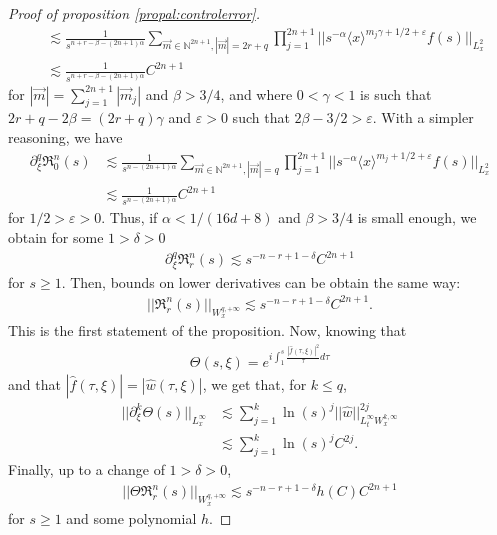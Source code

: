 \documentclass[10pt,a4paper]{amsart}
\begin{document}
\begin{proof}[Proof of proposition \ref{propal:controlerror}]
\begin{align*}
    &\lesssim \frac{1}{s^{n+r-\beta-(2n+1)\alpha}}\sum_{\overrightarrow{m}\in\mathbb{N}^{2n+1}, |\overrightarrow{m}|=2r+q}\prod^{2n+1}_{j=1}||s^{-\alpha}\langle x\rangle^{m_j\gamma+1/2+\varepsilon} f(s)||_{L^2_x} \\
    &\lesssim \frac{1}{s^{n+r-\beta-(2n+1)\alpha}}C^{2n+1}
\end{align*}
for $|\overrightarrow{m}|=\sum_{j=1}^{2n+1}|\overrightarrow{m}_j|$ and $\beta>3/4$, and where $0<\gamma<1$ is such that $2r+q-2\beta=(2r+q)\gamma$ and $\varepsilon>0$ such that $2\beta-3/2>\varepsilon$. With a simpler reasoning, we have 
\begin{align*}
    \partial^q_\xi \mathfrak{R}^n_0(s)
    &\lesssim \frac{1}{s^{n-(2n+1)\alpha}}\sum_{\overrightarrow{m}\in\mathbb{N}^{2n+1}, |\overrightarrow{m}|=q}\prod^{2n+1}_{j=1}||s^{-\alpha}\langle x\rangle^{m_j+1/2+\varepsilon} f(s)||_{L^2_x} \\
    &\lesssim \frac{1}{s^{n-(2n+1)\alpha}}C^{2n+1}
\end{align*}
for $1/2>\varepsilon>0$. Thus, if $\alpha<1/(16d+8)$ and $\beta>3/4$ is small enough, we obtain for some $1>\delta>0$
\begin{align*}
    \partial^q_\xi \mathfrak{R}^n_r(s)\lesssim s^{-n-r+1-\delta}C^{2n+1}
\end{align*}
for $s\geq 1$.
Then, bounds on lower derivatives can be obtain the same way:
\begin{align}
|| \mathfrak{R}^n_r(s)||_{W^{q,+\infty}_x}\lesssim s^{-n-r+1-\delta}C^{2n+1}.
\end{align}
This is the first statement of the proposition. Now, knowing that 
\begin{align*}
    \Theta(s,\xi)=e^{i\int^s_1\frac{|\hat{f}(\tau,\xi)|^2}{\tau}d\tau}
\end{align*}
and that $|\hat{f}(\tau,\xi)|=|\hat{w}(\tau,\xi)|$, we get that, for $k\leq q$,
\begin{align*}
    ||\partial^k_\xi \Theta(s)||_{L^\infty_x}&\lesssim \sum^{k}_{j=1}\ln(s)^j||\hat{w}||^{2j}_{L^\infty_t W^{k,\infty}_x}\\
   & \lesssim \sum^{k}_{j=1}\ln(s)^jC^{2j}.
\end{align*}
Finally, up to a change of $1>\delta>0$, 
\begin{align}
||\Theta\mathfrak{R}^n_r(s)||_{W^{q,+\infty}_x}\lesssim s^{-n-r+1-\delta}h(C)C^{2n+1}
\end{align}
for $s\geq 1$ and some polynomial $h$. 
\end{proof}
\end{document}
